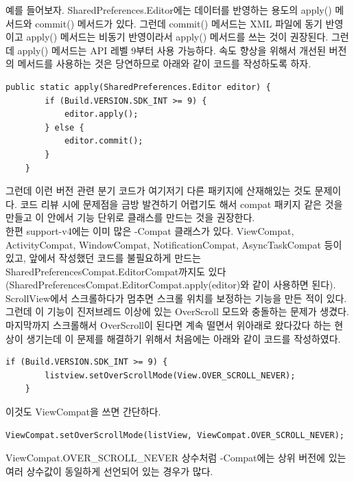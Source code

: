 예를 들어보자. SharedPreferences.Editor에는 데이터를 반영하는 용도의 apply() 메서드와 commit() 메서드가 있다. 
그런데 commit() 메서드는 XML 파일에 동기 반영이고 apply() 메서드는 비동기 반영이라서 apply() 메서드를 쓰는 것이 권장된다. 
그런데 apply() 메서드는 API 레벨 9부터 사용 가능하다. 속도 향상을 위해서 개선된 버전의 메서드를 사용하는 것은 당연하므로 아래와 같이 코드를 작성하도록 하자.
\begin{lstlisting}[frame=single]
	public static apply(SharedPreferences.Editor editor) {
		if (Build.VERSION.SDK_INT >= 9) {
   			editor.apply();
   		} else {
   			editor.commit();
   		}
	}
\end{lstlisting}

그런데 이런 버전 관련 분기 코드가 여기저기 다른 패키지에 산재해있는 것도 문제이다. 코드 리뷰 시에 문제점을 금방 발견하기 어렵기도 해서 compat 패키지 같은 것을 만들고 이 안에서 기능 단위로 클래스를 만드는 것을 권장한다.\\

한편 support-v4에는 이미 많은 -Compat 클래스가 있다. ViewCompat, ActivityCompat, WindowCompat, NotificationCompat, AsyncTaskCompat 등이 있고, 앞에서 작성했던 코드를 불필요하게 만드는 SharedPreferencesCompat.EditorCompat까지도 있다(SharedPreferencesCompat.EditorCompat.apply(editor)와 같이 사용하면 된다).\\

ScrollView에서 스크롤하다가 멈추면 스크롤 위치를 보정하는 기능을 만든 적이 있다. 그런데 이 기능이 진저브레드 이상에 있는 OverScroll 모드와 충돌하는 문제가 생겼다.
마지막까지 스크롤해서 OverScroll이 된다면 계속 떨면서 위아래로 왔다갔다 하는 현상이 생기는데 이 문제를 해결하기 위해서 처음에는 아래와 같이 코드를 작성하였다.
\begin{lstlisting}[frame=single]
	if (Build.VERSION.SDK_INT >= 9) {
   		listview.setOverScrollMode(View.OVER_SCROLL_NEVER);
	}
\end{lstlisting}
이것도 ViewCompat을 쓰면 간단하다.
\begin{lstlisting}[frame=single]
	ViewCompat.setOverScrollMode(listView, ViewCompat.OVER_SCROLL_NEVER);
\end{lstlisting}
ViewCompat.OVER\_SCROLL\_NEVER 상수처럼 -Compat에는 상위 버전에 있는 여러 상수값이 동일하게 선언되어 있는 경우가 많다.\\

